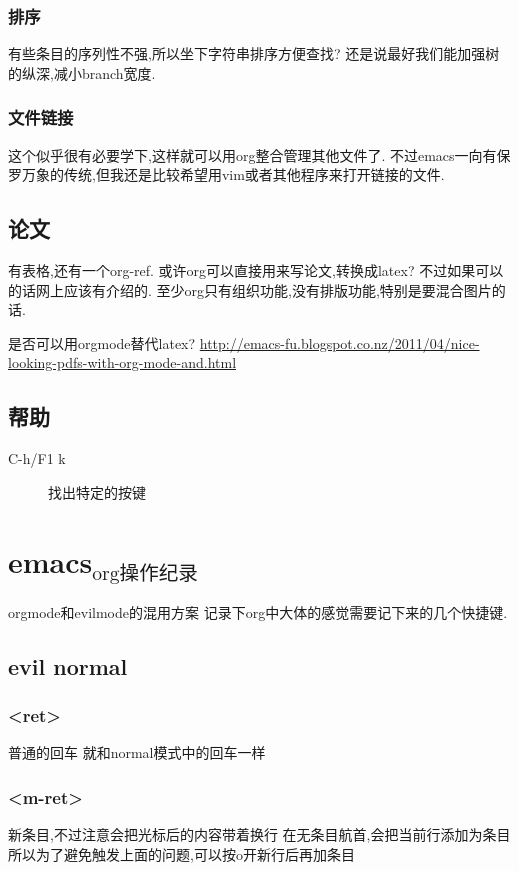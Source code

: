 \documentclass[12pt,a4paper]{article}
\begin{document}
\subsubsection{排序}
\label{sec:orgheadline38}
有些条目的序列性不强,所以坐下字符串排序方便查找?
还是说最好我们能加强树的纵深,减小branch宽度.
\subsubsection{文件链接}
\label{sec:orgheadline39}
这个似乎很有必要学下,这样就可以用org整合管理其他文件了.
不过emacs一向有保罗万象的传统,但我还是比较希望用vim或者其他程序来打开链接的文件.
\subsection{论文}
\label{sec:orgheadline41}
有表格,还有一个org-ref.
或许org可以直接用来写论文,转换成latex?
不过如果可以的话网上应该有介绍的.
至少org只有组织功能,没有排版功能,特别是要混合图片的话.

是否可以用orgmode替代latex?
\url{http://emacs-fu.blogspot.co.nz/2011/04/nice-looking-pdfs-with-org-mode-and.html}
\subsection{帮助}
\label{sec:orgheadline42}
\begin{description}
\item[{C-h/F1 k}] 找出特定的按键
\end{description}
\section{emacs\(_{\text{org操作纪录}}\)}
\label{sec:orgheadline78}
orgmode和evilmode的混用方案
记录下org中大体的感觉需要记下来的几个快捷键.
\subsection{evil normal}
\label{sec:orgheadline50}
\subsubsection{<ret>}
\label{sec:orgheadline44}
普通的回车 就和normal模式中的回车一样
\subsubsection{<m-ret>}
\label{sec:orgheadline45}
新条目,不过注意会把光标后的内容带着换行
在无条目航首,会把当前行添加为条目
所以为了避免触发上面的问题,可以按o开新行后再加条目
\end{document}
